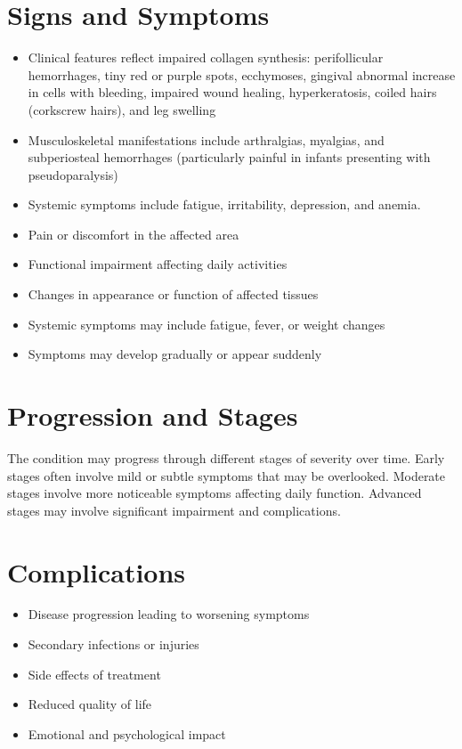 \section{Signs and Symptoms}
\begin{itemize}[noitemsep]
  \item Clinical features reflect impaired collagen synthesis: perifollicular hemorrhages, tiny red or purple spots, ecchymoses, gingival abnormal increase in cells with bleeding, impaired wound healing, hyperkeratosis, coiled hairs (corkscrew hairs), and leg swelling
  \item Musculoskeletal manifestations include arthralgias, myalgias, and subperiosteal hemorrhages (particularly painful in infants presenting with pseudoparalysis)
  \item Systemic symptoms include fatigue, irritability, depression, and anemia.
  \item Pain or discomfort in the affected area
  \item Functional impairment affecting daily activities
  \item Changes in appearance or function of affected tissues
  \item Systemic symptoms may include fatigue, fever, or weight changes
  \item Symptoms may develop gradually or appear suddenly
\end{itemize}
\section{Progression and Stages}
The condition may progress through different stages of severity over time. Early stages often involve mild or subtle symptoms that may be overlooked. Moderate stages involve more noticeable symptoms affecting daily function. Advanced stages may involve significant impairment and complications.
\section{Complications}
\begin{itemize}[noitemsep]
  \item Disease progression leading to worsening symptoms
  \item Secondary infections or injuries
  \item Side effects of treatment
  \item Reduced quality of life
  \item Emotional and psychological impact
\end{itemize}
